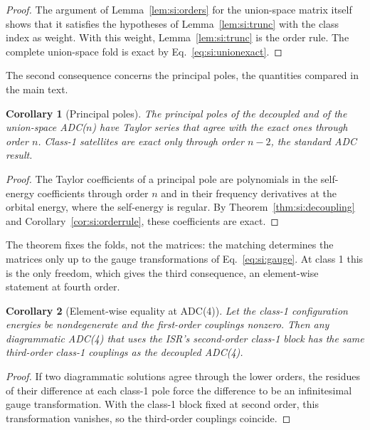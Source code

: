 \documentclass[aip,jcp,reprint,noshowkeys,superscriptaddress]{revtex4-2}
\theoremstyle{plain}
\newtheorem{corollary}{Corollary}
\theoremstyle{definition}
\theoremstyle{remark}
\begin{document}
\begin{proof}
The argument of Lemma~\ref{lem:si:orders} for the union-space matrix itself
shows that it satisfies the hypotheses of Lemma~\ref{lem:si:trunc} with the
class index as weight. With this weight, Lemma~\ref{lem:si:trunc} is the order
rule. The complete union-space fold is exact by
Eq.~\eqref{eq:si:unionexact}.
\end{proof}

The second consequence concerns the principal poles, the quantities compared in
the main text.

\begin{corollary}[Principal poles]
\label{cor:si:poles}
The principal poles of the decoupled and of the union-space ADC($n$) have
Taylor series that agree with the exact ones through order $n$. Class-1
satellites are exact only through order $n-2$, the standard ADC result.
\end{corollary}

\begin{proof}
The Taylor coefficients of a principal pole are polynomials in the self-energy
coefficients through order $n$ and in their frequency derivatives at the
orbital energy, where the self-energy is regular. By
Theorem~\ref{thm:si:decoupling} and Corollary~\ref{cor:si:orderrule}, these
coefficients are exact.
\end{proof}

The theorem fixes the folds, not the matrices: the matching determines the
matrices only up to the gauge transformations of Eq.~\eqref{eq:si:gauge}. At
class 1 this is the only freedom, which gives the third consequence, an
element-wise statement at fourth order.

\begin{corollary}[Element-wise equality at ADC(4)]
\label{cor:si:adc4}
Let the class-1 configuration energies be nondegenerate and the first-order
couplings nonzero. Then any diagrammatic ADC(4) that uses the ISR's
second-order class-1 block has the same third-order class-1 couplings as the
decoupled ADC(4).
\end{corollary}

\begin{proof}
If two diagrammatic solutions agree through the lower orders, the residues of
their difference at each class-1 pole force the difference to be an
infinitesimal gauge transformation. With the class-1 block fixed at second
order, this transformation vanishes, so the third-order couplings coincide.
\end{proof}
\end{document}
